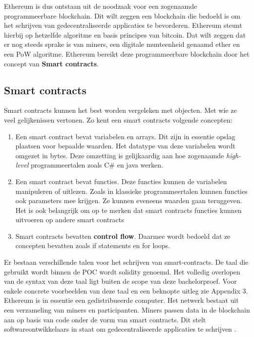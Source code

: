 Ethereum is dus ontstaan uit de noodzaak voor een zogenaamde programmeerbare blockchain. Dit wilt zeggen een blockchain die bedoeld is om het schrijven van gedecentraliseerde applicaties te bevorderen. Ethereum steunt hierbij op hetzelfde algoritme en basis principes van bitcoin. Dat wilt zeggen dat er nog steeds sprake is van miners, een digitale munteenheid genaamd ether en een PoW algoritme. Ethereum bereikt deze programmeerbare blockchain door het concept van \textbf{Smart contracts}.

\subsection{Smart contracts}
Smart contracts kunnen het best worden vergeleken met objecten. Met wie ze veel gelijkenissen vertonen. Zo kent een smart contracts volgende concepten:

\begin{enumerate}
\item Een smart contract bevat variabelen en arrays. Dit zijn in essentie opslag plaatsen voor bepaalde waarden. Het datatype van deze variabelen wordt omgezet in bytes. Deze omzetting is gelijkaardig aan hoe zogenaamde \textit{high-level} programmeertalen zoals C\# en java werken.\\
\item Een smart contract bevat functies. Deze functies kunnen de variabelen manipuleren of uitlezen. Zoals in klassieke programmeertalen kunnen functies ook parameters mee krijgen. Ze kunnen eveneens waarden gaan teruggeven. Het is ook belangrijk om op te merken dat smart contracts functies kunnen uitvoeren op andere smart contracts\
\item Smart contracts bevatten \textbf{control flow}. Daarmee wordt bedoeld dat ze concepten bevatten zoals if statements en for loops.
\end{enumerate}

Er bestaan verschillende talen voor het schrijven van smart-contracts. De taal die gebruikt wordt binnen de POC wordt solidity genoemd. Het volledig overlopen van de syntax van deze taal ligt buiten de scope van deze bachelorproef. Voor enkele concrete voorbeelden van deze taal en een beknopte uitleg zie Appendix 3.\\

Ethereum is in essentie een gedistribueerde computer. Het netwerk bestaat uit een verzameling van miners en participanten. Miners passen data in de blockchain aan op basis van code onder de vorm van smart contracts. Dit stelt softwareontwikkelaars in staat om gedecentraliseerde applicaties te schrijven .\\

